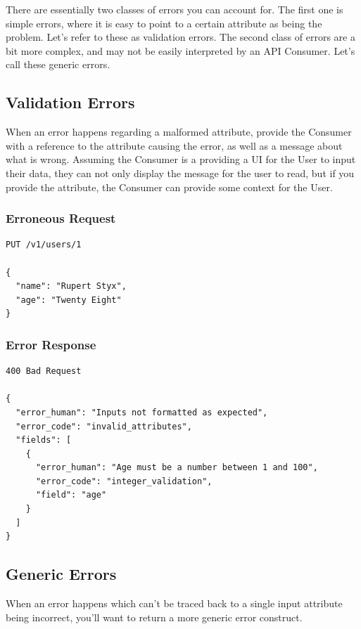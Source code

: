 \documentclass{book}
\begin{document}
There are essentially two classes of errors you can account for. The first one is simple errors, where it is easy to point to a certain attribute as being the problem. Let's refer to these as validation errors. The second class of errors are a bit more complex, and may not be easily interpreted by an API Consumer. Let's call these generic errors.

\subsection{Validation Errors}

When an error happens regarding a malformed attribute, provide the Consumer with a reference to the attribute causing the error, as well as a message about what is wrong. Assuming the Consumer is a providing a UI for the User to input their data, they can not only display the message for the user to read, but if you provide the attribute, the Consumer can provide some context for the User.

\subsubsection{Erroneous Request}

\begin{verbatim}
PUT /v1/users/1

{
  "name": "Rupert Styx",
  "age": "Twenty Eight"
}
\end{verbatim}

\subsubsection{Error Response}

\begin{verbatim}
400 Bad Request

{
  "error_human": "Inputs not formatted as expected",
  "error_code": "invalid_attributes",
  "fields": [
    {
      "error_human": "Age must be a number between 1 and 100",
      "error_code": "integer_validation",
      "field": "age"
    }
  ]
}
\end{verbatim}

\subsection{Generic Errors}

When an error happens which can't be traced back to a single input attribute being incorrect, you'll want to return a more generic error construct.
\end{document}
